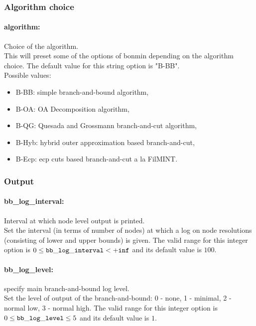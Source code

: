 \subsubsection{Algorithm choice}
\label{sec:Algorithm_choice}

\paragraph{algorithm:}\label{sec:algorithm} Choice of the algorithm. $\;$ \\
 This will preset some of the options of bonmin
depending on the algorithm choice.
The default value for this string option is "B-BB".
\\ 
Possible values:
\begin{itemize}
   \item B-BB: simple branch-and-bound algorithm,
   \item B-OA: OA Decomposition algorithm,
   \item B-QG: Quesada and Grossmann branch-and-cut algorithm,
   \item B-Hyb: hybrid outer approximation based branch-and-cut,
   \item B-Ecp: ecp cuts based branch-and-cut a la FilMINT.
\end{itemize}

\subsubsection{Output}
\label{sec:Bonmin_Output}

\paragraph{bb\_log\_interval:}\label{sec:bb_log_interval} Interval at which node level output is printed. $\;$ \\
 Set the interval (in terms of number of nodes) at
which a log on node resolutions (consisting of
lower and upper bounds) is given. The valid range for this integer option is
$0 \le {\tt bb\_log\_interval } <  {\tt +inf}$
and its default value is $100$.


\paragraph{bb\_log\_level:}\label{sec:bb_log_level} specify main branch-and-bound log level. $\;$ \\
 Set the level of output of the branch-and-bound:
0 - none, 1 - minimal, 2 - normal low, 3 - normal
high. The valid range for this integer option is
$0 \le {\tt bb\_log\_level } \le 5$
and its default value is $1$.


